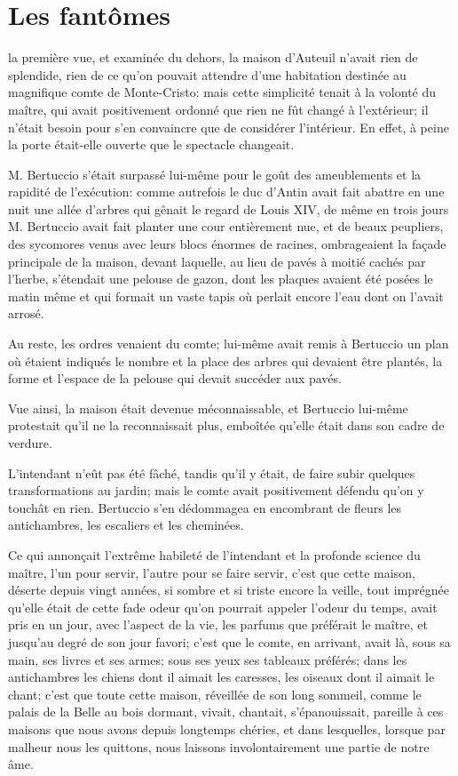 \chapter{Les fantômes} 

\lettrine{}{} la première vue, et examinée du dehors, la maison d'Auteuil n'avait rien de splendide, rien de ce qu'on pouvait attendre d'une habitation destinée au magnifique comte de Monte-Cristo: mais cette simplicité tenait à la volonté du maître, qui avait positivement ordonné que rien ne fût changé à l'extérieur; il n'était besoin pour s'en convaincre que de considérer l'intérieur. En effet, à peine la porte était-elle ouverte que le spectacle changeait. 

M. Bertuccio s'était surpassé lui-même pour le goût des ameublements et la rapidité de l'exécution: comme autrefois le duc d'Antin avait fait abattre en une nuit une allée d'arbres qui gênait le regard de Louis XIV, de même en trois jours M. Bertuccio avait fait planter une cour entièrement nue, et de beaux peupliers, des sycomores venus avec leurs blocs énormes de racines, ombrageaient la façade principale de la maison, devant laquelle, au lieu de pavés à moitié cachés par l'herbe, s'étendait une pelouse de gazon, dont les plaques avaient été posées le matin même et qui formait un vaste tapis où perlait encore l'eau dont on l'avait arrosé. 

Au reste, les ordres venaient du comte; lui-même avait remis à Bertuccio un plan où étaient indiqués le nombre et la place des arbres qui devaient être plantés, la forme et l'espace de la pelouse qui devait succéder aux pavés. 

Vue ainsi, la maison était devenue méconnaissable, et Bertuccio lui-même protestait qu'il ne la reconnaissait plus, emboîtée qu'elle était dans son cadre de verdure. 

L'intendant n'eût pas été fâché, tandis qu'il y était, de faire subir quelques transformations au jardin; mais le comte avait positivement défendu qu'on y touchât en rien. Bertuccio s'en dédommagea en encombrant de fleurs les antichambres, les escaliers et les cheminées. 

Ce qui annonçait l'extrême habileté de l'intendant et la profonde science du maître, l'un pour servir, l'autre pour se faire servir, c'est que cette maison, déserte depuis vingt années, si sombre et si triste encore la veille, tout imprégnée qu'elle était de cette fade odeur qu'on pourrait appeler l'odeur du temps, avait pris en un jour, avec l'aspect de la vie, les parfums que préférait le maître, et jusqu'au degré de son jour favori; c'est que le comte, en arrivant, avait là, sous sa main, ses livres et ses armes; sous ses yeux ses tableaux préférés; dans les antichambres les chiens dont il aimait les caresses, les oiseaux dont il aimait le chant; c'est que toute cette maison, réveillée de son long sommeil, comme le palais de la Belle au bois dormant, vivait, chantait, s'épanouissait, pareille à ces maisons que nous avons depuis longtemps chéries, et dans lesquelles, lorsque par malheur nous les quittons, nous laissons involontairement une partie de notre âme. 


